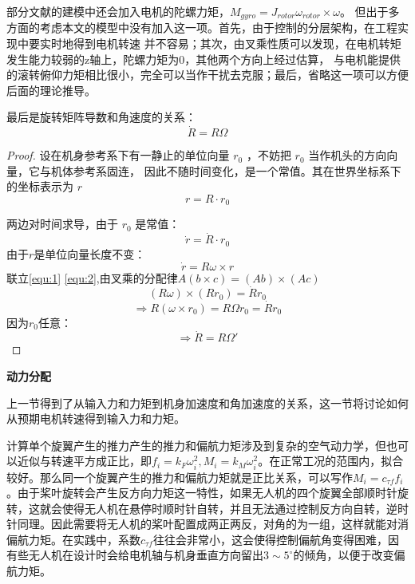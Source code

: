     部分文献的建模中还会加入电机的陀螺力矩\cite{quanbook}，$M_{gyro}=J_{rotor} \omega_{rotor} \times \omega$。 
    但出于多方面的考虑本文的模型中没有加入这一项。首先，由于控制的分层架构，在工程实现中要实时地得到电机转速  并不容易；其次，由叉乘性质可以发现，在电机转矩发生能力较弱的z轴上，陀螺力矩为$0$，其他两个方向上经过估算，
    与电机能提供的滚转俯仰力矩相比很小，完全可以当作干扰去克服；最后，省略这一项可以方便后面的理论推导。

最后是旋转矩阵导数和角速度的关系：
  \begin{equation}
    \dot R=R\Omega
    \label{equ:dotR}
  \end{equation}

\begin{proof}
  设在机身参考系下有一静止的单位向量 $r_0$ ，不妨把 $r_0$ 当作机头的方向向量，它与机体参考系固连，
  因此不随时间变化，是一个常值。其在世界坐标系下的坐标表示为 $r$ 
  $$r=R \cdot r_0$$
  
  两边对时间求导，由于 $r_0$ 是常值：
  \begin{equation}
    \dot r= \dot R \cdot r_0
    \label{equ:1}
  \end{equation}
  由于$r$是单位向量长度不变：
  \begin{equation}
    \dot r=R \omega \times r
    \label{equ:2}
  \end{equation}
  联立\ref{equ:1}  \ref{equ:2},由叉乘的分配律$A(b\times c)=(Ab)\times (Ac)$
  $$(R\omega)\times(Rr_0)=\dot R r_0$$
  $$\Rightarrow R(\omega \times r_0)=R\Omega r_0=\dot R r_0$$
  因为$r_0$任意：
  $$\Rightarrow \dot R=R \Omega'$$

\end{proof}

\textbf{动力分配}

上一节得到了从输入力和力矩到机身加速度和角加速度的关系，这一节将讨论如何从预期电机转速得到输入力和力矩。

计算单个旋翼产生的推力产生的推力和偏航力矩涉及到复杂的空气动力学，但也可以近似与转速平方成正比\cite{minimumsnap}，即$f_i=k_F \omega_i^2,M_i=k_M \omega_i^2$。在正常工况的范围内，拟合较好。那么同一个旋翼产生的推力和偏航力矩就是正比关系，可以写作$M_i=c_{\tau f}f_i$。由于桨叶旋转会产生反方向力矩这一特性，如果无人机的四个旋翼全部顺时针旋转，这就会使得无人机在悬停时顺时针自转，并且无法通过控制反方向自转，逆时针同理。因此需要将无人机的桨叶配置成两正两反，对角的为一组，这样就能对消偏航力矩。在实践中，系数$c_{\tau f}$往往会非常小，这会使得控制偏航角变得困难，因有些无人机在设计时会给电机轴与机身垂直方向留出$3\sim5^\circ$的倾角，以便于改变偏航力矩。

